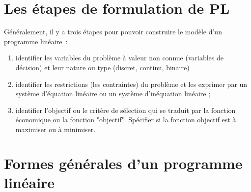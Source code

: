 \documentclass[a4paper,12pt,openany]{book}
\theoremstyle{plain}
\theoremstyle{definition}
\theoremstyle{remark}
\theoremstyle{nbstyle}
\begin{document}
	\section{Les étapes de formulation de PL}
	Généralement, il y a trois étapes pour pouvoir construire le modèle d'un programme linéaire :
	\begin{enumerate}
		\item identifier les variables du problème à valeur non connue (variables de décision) et leur nature ou type (discret, continu, binaire)
		\item identifier les restrictions (les contraintes) du problème et les exprimer par un système d'équation linéaire ou un système d'inéquation linéaire ;
		\item  identifier l'objectif ou le critère de sélection qui se traduit par la fonction économique ou la fonction "objectif". Spécifier si la fonction objectif est à maximiser ou à minimiser.
	\end{enumerate}
	
	\section{Formes générales d'un programme linéaire}
	
\end{document}
